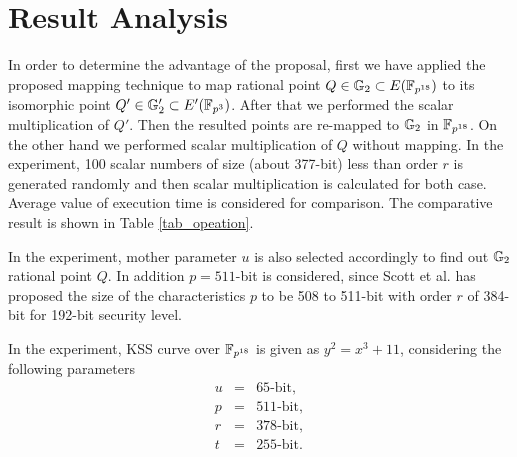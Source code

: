         
        \section{Result Analysis}
        In order to determine the advantage of the proposal, first we have applied the proposed mapping technique to map rational point $Q \in {\mathbb{G}}_{2} \subset E({\mathbb{F}}_{p^{18}})$ to its isomorphic point $Q' \in {\mathbb{G}}_{2}' \subset E'({\mathbb{F}}_{p^{3}})$. After that we performed the scalar multiplication of $Q'$. Then the resulted points are re-mapped to ${\mathbb{G}}_{2}$ in $\mathbb{F}_{p^{18}}$. On the other hand we performed scalar multiplication of $Q$ without mapping. In the experiment, 100 scalar numbers of size (about 377-bit) less than order $r$ is generated randomly and then scalar multiplication is calculated for both case. Average value of execution time is considered for comparison.
        The comparative result is shown in Table \ref{tab_opeation}.
        
        In the experiment, mother parameter $u$ is also selected accordingly to find out ${\mathbb{G}}_{2}$ rational point $Q$. In addition $p=511$-bit is considered, since Scott et al. \cite{kss_param} has proposed the size of the characteristics $p$ to be 508 to 511-bit with order $r$ of 384-bit for 192-bit security level.
        
        In the experiment, KSS curve over $\mathbb{F}_{p^{18}}$ is given as $y^2 = x^3 + 11$, considering the following parameters
        \begin{eqnarray}
        u & = & 65   \mbox{-bit},  \nonumber \\ 
        p  & = & 511 \mbox{-bit},  \nonumber \\ 
        r  & = & 378 \mbox{-bit} ,\nonumber \\ 
        t  & = & 255  \mbox{-bit}. \nonumber
        \end{eqnarray}
        
